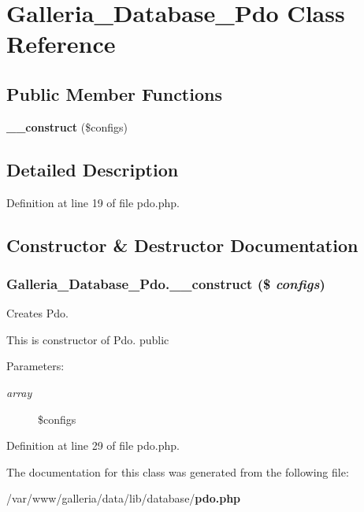 \section{Galleria\_\-Database\_\-Pdo Class Reference}
\label{classGalleria__Database__Pdo}
\subsection*{Public Member Functions}
\begin{CompactItemize}
\item 
{\bf \_\-\_\-construct} (\$configs)
\end{CompactItemize}


\subsection{Detailed Description}


Definition at line 19 of file pdo.php.

\subsection{Constructor \& Destructor Documentation}
\subsubsection{\setlength{\rightskip}{0pt plus 5cm}Galleria\_\-Database\_\-Pdo.\_\-\_\-construct (\$ {\em configs})}\label{classGalleria__Database__Pdo_406d3a42b6a64482df99d1020746cd81}


Creates Pdo.

This is constructor of Pdo.  public \begin{Desc}
\item[Parameters:]
\begin{description}
\item[{\em array}]\$configs \end{description}
\end{Desc}


Definition at line 29 of file pdo.php.

The documentation for this class was generated from the following file:\begin{CompactItemize}
\item 
/var/www/galleria/data/lib/database/{\bf pdo.php}\end{CompactItemize}
